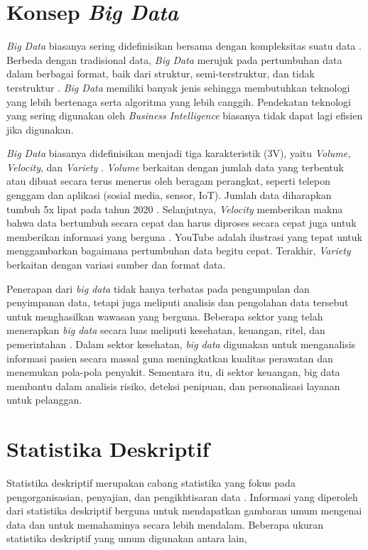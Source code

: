 \section{Konsep \textit{Big Data}}
\textit{Big Data} biasanya sering didefinisikan bersama dengan kompleksitas suatu data \cite{barosenAnalysisComparisonInterfacing2018}. Berbeda dengan tradisional data, \textit{Big Data} merujuk pada pertumbuhan data dalam berbagai format, baik dari struktur, semi-terstruktur, dan tidak terstruktur \cite{oussousBigDataTechnologies2018}. \textit{Big Data} memiliki banyak jenis sehingga membutuhkan teknologi yang lebih bertenaga serta algoritma yang lebih canggih. Pendekatan teknologi yang sering digunakan oleh \textit{Business Intelligence} biasanya tidak dapat lagi efisien jika digunakan.

\textit{Big Data} biasanya didefinisikan menjadi tiga karakteristik (3V), yaitu \textit{Volume, Velocity}, dan \textit{Variety} \cite{furhtIntroductionBigData2016}. \textit{Volume} berkaitan dengan jumlah data yang terbentuk atau dibuat secara terus menerus oleh beragam  perangkat, seperti telepon genggam dan aplikasi (sosial media, sensor, IoT). Jumlah data diharapkan tumbuh 5x lipat pada tahun 2020 \cite{furhtIntroductionBigData2016}. Selanjutnya, \textit{Velocity} memberikan makna bahwa data bertumbuh secara cepat dan harus diproses secara cepat juga untuk memberikan informasi yang berguna \cite{sandhuBigDataCloud2022}. YouTube adalah ilustrasi yang tepat untuk menggambarkan bagaimana pertumbuhan data begitu cepat. Terakhir, \textit{Variety} berkaitan dengan variasi sumber dan format data. 

Penerapan dari \textit{big data} tidak hanya terbatas pada pengumpulan dan penyimpanan data, tetapi juga meliputi analisis dan pengolahan data tersebut untuk menghasilkan wawasan yang berguna. Beberapa sektor yang telah menerapkan \textit{big data} secara luas meliputi kesehatan, keuangan, ritel, dan pemerintahan \cite{oussousBigDataTechnologies2018}. Dalam sektor kesehatan, \textit{big data} digunakan untuk menganalisis informasi pasien secara massal guna meningkatkan kualitas perawatan dan menemukan pola-pola penyakit. Sementara itu, di sektor keuangan, big data membantu dalam analisis risiko, deteksi penipuan, dan personalisasi layanan untuk pelanggan.

\section{Statistika Deskriptif}
Statistika deskriptif merupakan cabang statistika yang fokus pada pengorganisasian, penyajian, dan pengikhtisaran data \cite{rossIntroductoryStatistics2017}. Informasi yang diperoleh dari statistika deskriptif berguna untuk mendapatkan gambaran umum mengenai data dan untuk memahaminya secara lebih mendalam. Beberapa ukuran statistika deskriptif yang umum digunakan antara lain,

